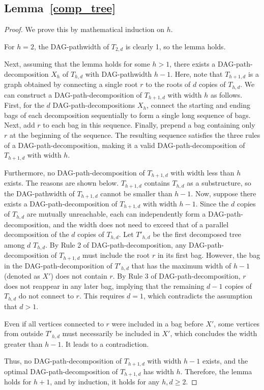 \documentclass[runningheads]{llncs}
\theoremstyle{plain}
\theoremstyle{definition}
\begin{document}
\subsection{\textbf{Lemma~\ref{comp_tree}}}
\begin{proof}
    We prove this by mathematical induction on $h$. 
    
    For $h=2$, the DAG-pathwidth of $T_{2, d}$ is clearly 1, so the lemma holds. 
    
    Next, assuming that the lemma holds for some $h > 1$, there exists a DAG-path-decomposition $X_h$ of $T_{h, d}$ with DAG-pathwidth $h-1$. Here, note that $T_{h+1, d}$ is a graph obtained by connecting a single root $r$ to the roots of $d$ copies of $T_{h, d}$. We can construct a DAG-path-decomposition of $T_{h+1, d}$ with width $h$ as follows. First, for the $d$ DAG-path-decompositions $X_h$, connect the starting and ending bags of each decomposition sequentially to form a single long sequence of bags. Next, add $r$ to each bag in this sequence. Finally, prepend a bag containing only $r$ at the beginning of the sequence. The resulting sequence satisfies the three rules of a DAG-path-decomposition, making it a valid DAG-path-decomposition of $T_{h+1, d}$ with width $h$.
    
    Furthermore, no DAG-path-decomposition of $T_{h+1, d}$ with width less than $h$ exists. The reasons are shown below. $T_{h+1, d}$ contains $T_{h, d}$ as a substructure, so the DAG-pathwidth of $T_{h+1, d}$ cannot be smaller than $h-1$. Now, suppose there exists a DAG-path-decomposition of $T_{h+1, d}$ with width $h-1$. Since the $d$ copies of $T_{h, d}$ are mutually unreachable, each can independently form a DAG-path-decomposition, and the width does not need to exceed that of a parallel decomposition of the $d$ copies of $T_{h, d}$. Let $T'_{h, d}$ be the first decomposed tree among $d$ $T_{h, d}$. By Rule 2 of DAG-path-decomposition, any DAG-path-decomposition of $T_{h+1, d}$ must include the root $r$ in its first bag. However, the bag in the DAG-path-decomposition of $T'_{h, d}$ that has the maximum width of $h-1$ (denoted as $X'$) does not contain $r$. By Rule 3 of DAG-path-decomposition, $r$ does not reappear in any later bag, implying that the remaining $d-1$ copies of $T_{h, d}$ do not connect to $r$. This requires $d=1$, which contradicts the assumption that $d > 1$. 
    
    Even if all vertices connected to $r$ were included in a bag before $X'$, some vertices from outside $T'_{h, d}$ must necessarily be included in $X'$, which concludes the width greater than $h-1$. It leads to a contradiction.
    
    Thus, no DAG-path-decomposition of $T_{h+1, d}$ with width $h-1$ exists, and the optimal DAG-path-decomposition of $T_{h+1, d}$ has width $h$. Therefore, the lemma holds for $h+1$, and by induction, it holds for any $h, d \geq 2$.
    
\end{proof}
\end{document}
